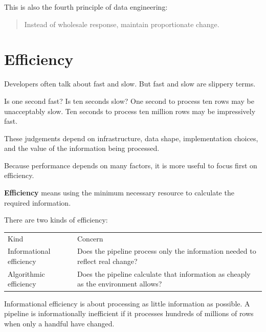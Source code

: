 \documentclass[10pt,openany,10pt]{book}
\newcounter{none}
\let\podeToprule\toprule
\let\podeMidrule\midrule
\let\podeBottomrule\bottomrule
\renewcommand{\toprule}{\arrayrulecolor{pbiGrid}\podeToprule}
\renewcommand{\midrule}{\arrayrulecolor{pbiGrid}\podeMidrule}
\renewcommand{\bottomrule}{\arrayrulecolor{pbiGrid}\podeBottomrule}
\begin{document}
This is also the fourth principle of data engineering:

\begin{quote}
Instead of wholesale response, maintain proportionate change.
\end{quote}

\section{Efficiency}\label{efficiency}

Developers often talk about fast and slow. But fast and slow are
slippery terms.

Is one second fast? Is ten seconds slow? One second to process ten rows
may be unacceptably slow. Ten seconds to process ten million rows may be
impressively fast.

These judgements depend on infrastructure, data shape, implementation
choices, and the value of the information being processed.

Because performance depends on many factors, it is more useful to focus
first on efficiency.

\textbf{Efficiency} means using the minimum necessary resource to
calculate the required information.

There are two kinds of efficiency:

{\def\LTcaptype{none} %
\begin{longtable}[]{@{}
  >{\raggedright\arraybackslash}p{}
  >{\raggedright\arraybackslash}p{}@{}}
\toprule\noalign{}
\begin{minipage}[b]{\linewidth}\raggedright
Kind
\end{minipage} & \begin{minipage}[b]{\linewidth}\raggedright
Concern
\end{minipage} \\
\midrule\noalign{}
\endhead
\bottomrule\noalign{}
\endlastfoot
Informational efficiency & Does the pipeline process only the
information needed to reflect real change? \\
Algorithmic efficiency & Does the pipeline calculate that information as
cheaply as the environment allows? \\
\end{longtable}
}

Informational efficiency is about processing as little information as
possible. A pipeline is informationally inefficient if it processes
hundreds of millions of rows when only a handful have changed.
\end{document}
